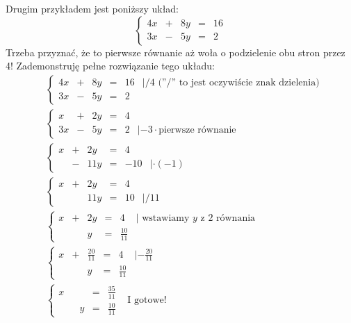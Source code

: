 \documentclass{article}
\theoremstyle{remark}
\begin{document}
Drugim przykładem jest poniższy układ:
\begin{displaymath}
  \left\{
    \begin{array}{lllll}
      4x &+& 8y &=& 16\\
      3x &-& 5y &=& 2
    \end{array}
    \right.
\end{displaymath}
Trzeba przyznać, że to pierwsze równanie aż woła o podzielenie obu stron przez 4!
Zademonstruję pełne rozwiązanie tego układu:
\begin{align*}
  &\left\{
    \begin{array}{llllll}
      4x &+& 8y &=& 16&|/4 \text{ (''/'' to jest oczywiście znak dzielenia)}\\
      3x &-& 5y &=& 2 &
    \end{array}
  \right.\\
  &\left\{
    \begin{array}{llllll}
      x &+& 2y &=& 4&\\
      3x &-& 5y &=& 2 &|-3\cdot  \text{pierwsze równanie}
    \end{array}
  \right.\\
  &\left\{
    \begin{array}{llllll}
      x &+& 2y &=& 4&\\
       &-& 11y &=& -10 &|\cdot(-1)
    \end{array}
  \right.\\
  &\left\{
    \begin{array}{llllll}
      x &+& 2y &=& 4&\\
       && 11y &=& 10 &|/11
    \end{array}
  \right.\\
  &\left\{
    \begin{array}{llllll}
      x &+& 2y &=& 4&|\text{ wstawiamy $y$ z 2 równania}\\
       && y &=& \frac{10}{11}&
    \end{array}
  \right.\\
  &\left\{
    \begin{array}{llllll}
      x &+& \frac{20}{11} &=& 4&|-\frac{20}{11}\\
       && y &=& \frac{10}{11}&
    \end{array}
  \right.\\
  &\left\{
    \begin{array}{llllll}
      x && &=& \frac{35}{11}&\\[5pt]
       && y &=& \frac{10}{11}&
    \end{array}
  \right.\text{I gotowe!}\\
\end{align*}
\end{document}
